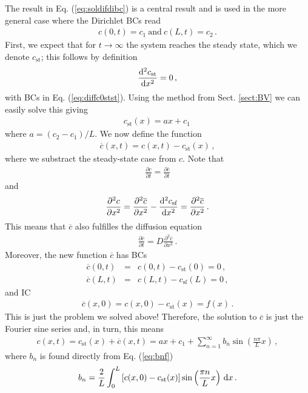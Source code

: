 \noindent The result in Eq. (\ref{eq:soldifdibc}) is a central result and is used in the more 
general case where the Dirichlet BCs read
\begin{eqnarray}
	\label{eq:diffc0stst}
	c(0,t) = c_1 \ \text{and} \ c(L,t)=c_2 \, .
\end{eqnarray}
First, we expect that for $t \rightarrow \infty$ the system reaches the steady state,
which we denote $c_\text{st}$; this follows by definition
\begin{eqnarray}
	\frac{\mathrm{d}^2 c_{\text{st}}}{\mathrm{d} x^2} = 0 \, ,
\end{eqnarray}
with BCs in Eq. (\ref{eq:diffc0stst}). Using the method from Sect. \ref{sect:BV} we can 
easily solve this giving 
\begin{eqnarray}
	c_\text{st}(x) = ax + c_1 \, 
\end{eqnarray}
where $a = (c_2-c_1)/L$. We now define the function
\begin{eqnarray}
	\overline{c} (x,t) = c(x,t) - c_\text{st}(x) \, , 
\end{eqnarray}
where we substract the steady-state case from $c$. Note that 
\begin{eqnarray}
	\frac{\partial c}{\partial t} = \frac{\partial \overline{c}}{\partial t} 
\end{eqnarray}
and
\begin{eqnarray}
	\frac{\partial^2 c}{\partial x^2} = \frac{\partial^2 \overline{c}}{\partial x^2} 
	- \frac{\mathrm{d}^2  c_{\text{sf}}}{\mathrm{d} x^2} = \frac{\partial^2 \overline{c}}{\partial x^2}
	\, .
\end{eqnarray}
This means that $\overline{c}$ also fulfilles the diffusion equation
\begin{eqnarray}
	\frac{\partial \overline{c}}{\partial t} = D\frac{\partial^2\overline{c}}{\partial{x}^2} \, .
\end{eqnarray}
Moreover, the new function $\overline{c}$ has BCs
\begin{eqnarray}
	\overline{c} (0,t) &=& c(0,t) - c_\text{st}(0) = 0 \, ,\\
	\overline{c} (L,t) &=& c(L,t) - c_\text{sf}(L) = 0 \, ,
\end{eqnarray}
and IC
\begin{eqnarray}
	\overline{c}(x,0) = c(x,0) - c_\text{st}(x) = f(x) \, .
\end{eqnarray}
This is just the problem we solved above! Therefore, the solution to $\overline{c}$ is 
just the Fourier sine series and, in turn, this means
\begin{eqnarray}
	c(x,t) = c_\text{st}(x) + \overline{c}(x,t)=ax+c_1 + \sum_{n=1}^\infty b_n \sin\left(\frac{n\pi}{L}x\right) \, ,
\end{eqnarray}
where $b_n$ is found directly from Eq. (\ref{eq:bnf}) 
\begin{eqnarray}
	b_n = \frac{2}{L} \int_0^L \left[ c(x,0) - c_\text{st}(x) \right] \sin\left( \frac{\pi n}{L} x \right) \, \mathrm{d} x \, .
\end{eqnarray}

